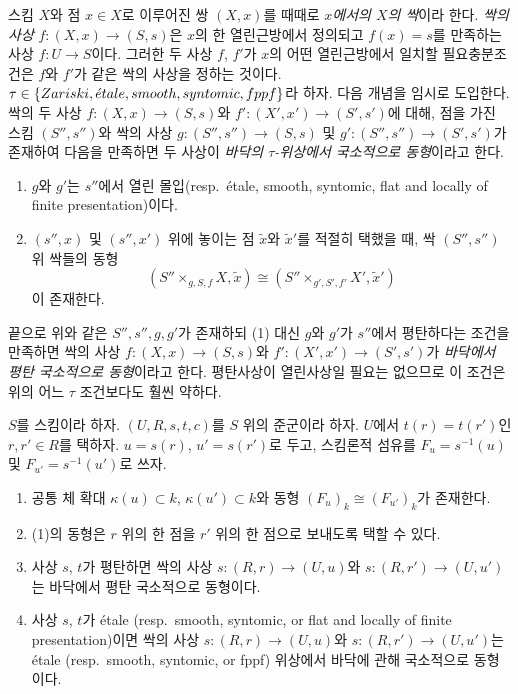 \medskip\noindent
스킴 $X$와 점 $x \in X$로 이루어진 쌍 $(X, x)$를 때때로
{\it $x$에서의 $X$의 싹}이라 한다.
{\it 싹의 사상} $f : (X, x) \to (S, s)$은 $x$의 한 열린근방에서
정의되고 $f(x) = s$를 만족하는 사상 $f : U \to S$이다.
그러한 두 사상 $f$, $f'$가 $x$의 어떤 열린근방에서 일치할 필요충분조건은
$f$와 $f'$가 같은 싹의 사상을 정하는 것이다.
$\tau \in \{Zariski, {\acute{e}tale}, smooth, syntomic, fppf\}$라 하자.
다음 개념을 임시로 도입한다. 싹의 두 사상
$f : (X, x) \to (S, s)$와 $f' : (X', x') \to (S', s')$에 대해,
점을 가진 스킴 $(S'', s'')$와 싹의 사상
$g : (S'', s'') \to (S, s)$ 및 $g' : (S'', s'') \to (S', s')$가
존재하여 다음을 만족하면 두 사상이 {\it 바닥의 $\tau$-위상에서
국소적으로 동형}이라고 한다.
\begin{enumerate}
\item $g$와 $g'$는 $s''$에서 열린 몰입(resp.\ \'etale, smooth, syntomic,
flat and locally of finite presentation)이다.
\item $(s'', x)$ 및 $(s'', x')$ 위에 놓이는 점 $\tilde x$와
$\tilde x'$를 적절히 택했을 때, 싹 $(S'', s'')$ 위 싹들의 동형
$$
(S'' \times_{g, S, f} X, \tilde x)
\cong
(S'' \times_{g', S', f'} X', \tilde  x')
$$
이 존재한다.
\end{enumerate}
끝으로 위와 같은 $S'', s'', g, g'$가 존재하되 (1) 대신 $g$와 $g'$가
$s''$에서 평탄하다는 조건을 만족하면 싹의 사상
$f : (X, x) \to (S, s)$와 $f' : (X', x') \to (S', s')$가
{\it 바닥에서 평탄 국소적으로 동형}이라고 한다. 평탄사상이 열린사상일
필요는 없으므로 이 조건은 위의 어느 $\tau$ 조건보다도 훨씬 약하다.

\begin{lemma}
\label{lemma-two-fibres}
$S$를 스킴이라 하자.
$(U, R, s, t, c)$를 $S$ 위의 준군이라 하자.
$U$에서 $t(r) = t(r')$인 $r, r' \in R$를 택하자.
$u = s(r)$, $u' = s(r')$로 두고, 스킴론적 섬유를
$F_u = s^{-1}(u)$ 및 $F_{u'} = s^{-1}(u')$로 쓰자.
\begin{enumerate}
\item 공통 체 확대 $\kappa(u) \subset k$, $\kappa(u') \subset k$와
동형 $(F_u)_k \cong (F_{u'})_k$가 존재한다.
\item (1)의 동형은 $r$ 위의 한 점을 $r'$ 위의 한 점으로 보내도록
택할 수 있다.
\item 사상 $s$, $t$가 평탄하면 싹의 사상
$s : (R, r) \to (U, u)$와 $s : (R, r') \to (U, u')$는 바닥에서
평탄 국소적으로 동형이다.
\item 사상 $s$, $t$가 \'etale
(resp.\ smooth, syntomic, or flat and locally of finite presentation)이면
싹의 사상 $s : (R, r) \to (U, u)$와
$s : (R, r') \to (U, u')$는 \'etale (resp.\ smooth, syntomic, or fppf)
위상에서 바닥에 관해 국소적으로 동형이다.
\end{enumerate}
\end{lemma}

